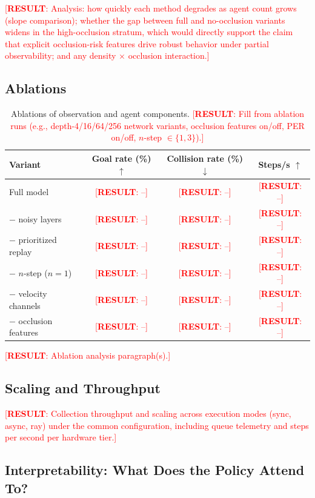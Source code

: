 \documentclass{article}
\newcommand{\results}[1]{\textcolor{red}{[\textbf{RESULT}: #1]}}
\begin{document}
\results{Analysis: how quickly each method degrades as agent count grows
(slope comparison); whether the gap between full and no-occlusion variants
widens in the high-occlusion stratum, which would directly support the
claim that explicit occlusion-risk features drive robust behavior under
partial observability; and any density $\times$ occlusion interaction.}

\subsection{Ablations}

\begin{table}[t]
\centering
\caption{Ablations of observation and agent components. \results{Fill from
ablation runs (e.g., depth-4/16/64/256 network variants, occlusion features
on/off, PER on/off, $n$-step $\in \{1,3\}$).}}
\label{tab:ablations}
\begin{tabular}{lccc}
\toprule
Variant & Goal rate (\%) $\uparrow$ & Collision rate (\%) $\downarrow$ & Steps/s $\uparrow$ \\
\midrule
Full model                    & \results{--} & \results{--} & \results{--} \\
$-$ noisy layers              & \results{--} & \results{--} & \results{--} \\
$-$ prioritized replay        & \results{--} & \results{--} & \results{--} \\
$-$ $n$-step ($n{=}1$)        & \results{--} & \results{--} & \results{--} \\
$-$ velocity channels         & \results{--} & \results{--} & \results{--} \\
$-$ occlusion features        & \results{--} & \results{--} & \results{--} \\
\bottomrule
\end{tabular}
\end{table}

\results{Ablation analysis paragraph(s).}

\subsection{Scaling and Throughput}

\results{Collection throughput and scaling across execution modes (sync,
async, ray) under the common configuration, including queue telemetry and
steps per second per hardware tier.}

\subsection{Interpretability: What Does the Policy Attend To?}
\label{sec:interpretability}
\end{document}
